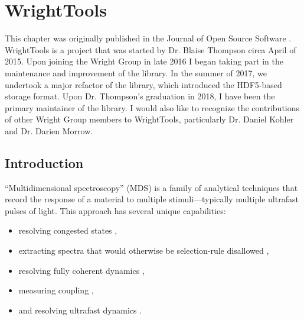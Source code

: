 




\chapter{WrightTools}  %

\clearpage

This chapter was originally published in the Journal of Open Source Software \cite{ThompsonBlaiseJonathan2019a}.
WrightTools is a project that was started by Dr. Blaise Thompson circa April of 2015.
Upon joining the Wright Group in late 2016 I began taking part in the maintenance and improvement of the library.
In the summer of 2017, we undertook a major refactor of the library, which introduced the HDF5-based storage format.
Upon Dr. Thompson's graduation in 2018, I have been the primary maintainer of the library.
I would also like to recognize the contributions of other Wright Group members to WrightTools, particularly Dr. Daniel Kohler and Dr. Darien Morrow.

\hypertarget{introduction}{%
\section{Introduction}\label{introduction}}

``Multidimensional spectroscopy'' (MDS) is a family of analytical
techniques that record the response of a material to multiple
stimuli---typically multiple ultrafast pulses of light. This approach
has several unique capabilities:

\begin{itemize}
\item
	resolving congested states \cite{ZhaoWei1999b}\cite{DonaldsonPaulMurray2008a},
\item
  extracting spectra that would otherwise be selection-rule disallowed
		\cite{BoyleErinSelene2013b}\cite{BoyleErinSelene2014a},
\item
  resolving fully coherent dynamics \cite{PakoulevAndreiV2009a},
\item
  measuring coupling \cite{WrightJohnCurtis2011a},
\item
	and resolving ultrafast dynamics \cite{SmallwoodChristopherL2018a}\cite{CzechKyleJonathan2015a}.
\end{itemize}

